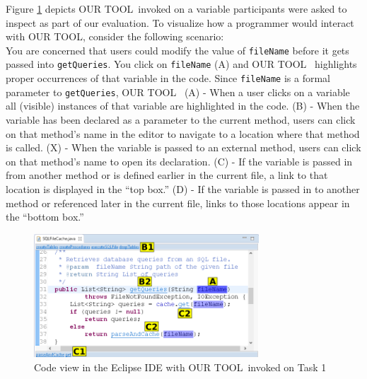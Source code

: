 \documentclass[conference]{IEEEtran}
\newcommand{\toolName}{OUR TOOL}
\begin{document}
Figure \ref{fig:tool} depicts \toolName~invoked on a variable participants were asked to inspect as part of our evaluation. To visualize how a programmer would interact with \toolName, consider the following scenario:\\
You are concerned that users could modify the value of \texttt{fileName} before it gets passed into \texttt{getQueries}. 
You click on \texttt{fileName} (A) and \toolName~ highlights proper occurrences of that variable in the code.
Since \texttt{fileName} is a formal parameter to \texttt{getQueries}, \toolName~ 
(A) - When a user clicks on a variable all (visible) instances of that variable are highlighted in the code. (B) - When the variable has been declared as a parameter to the current method, users can click on that method's name in the editor to navigate to a location where that method is called. (X) - When the variable is passed to an external method, users can click on that method's name to open its declaration. (C) - If the variable is passed in from another method or is defined earlier in the current file, a link to that location is displayed in the ``top box.'' (D) - If the variable is passed in to another method or referenced later in the current file, links to those locations appear in the ``bottom box.''

\begin{figure}
	\centering
	\includegraphics[width=0.75\textwidth]{images/toolScreenshot}
	\caption{Code view in the Eclipse IDE with \toolName~invoked on Task 1}	
	\label{fig:tool} 
\end{figure}

\end{document}
